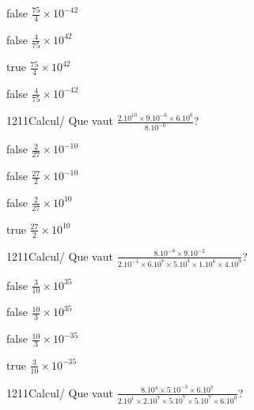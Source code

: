 \documentclass[11pt]{article}
\begin{document}
            \begin{reponses}
                \item[false] $\frac{75}{4}\times 10^{-42}$
                \item[false] $\frac{4}{75}\times 10^{42}$
                \item[true] $\frac{75}{4}\times 10^{42}$
                \item[false] $\frac{4}{75}\times 10^{-42}$
            \end{reponses}
            
            \begin{question}{1211}{Calcul}{}{/}
                Que vaut $\frac{2.10^{10}\times 9.10^{-6}\times 6.10^{0}}{8.10^{-6}}$?
            \end{question}
            
            \begin{reponses}
                \item[false] $\frac{2}{27}\times 10^{-10}$
                \item[false] $\frac{27}{2}\times 10^{-10}$
                \item[false] $\frac{2}{27}\times 10^{10}$
                \item[true] $\frac{27}{2}\times 10^{10}$
            \end{reponses}
            
            \begin{question}{1211}{Calcul}{}{/}
                Que vaut $\frac{8.10^{-8}\times 9.10^{-2}}{2.10^{-1}\times 6.10^{7}\times 5.10^{4}\times 1.10^{6}\times 4.10^{9}}$?
            \end{question}
            
            \begin{reponses}
                \item[false] $\frac{3}{10}\times 10^{35}$
                \item[false] $\frac{10}{3}\times 10^{35}$
                \item[false] $\frac{10}{3}\times 10^{-35}$
                \item[true] $\frac{3}{10}\times 10^{-35}$
            \end{reponses}
            
            \begin{question}{1211}{Calcul}{}{/}
                Que vaut $\frac{8.10^{4}\times 5.10^{-3}\times 6.10^{7}}{2.10^{1}\times 2.10^{7}\times 5.10^{7}\times 5.10^{7}\times 6.10^{0}}$?
            \end{question}
            
\end{document}
